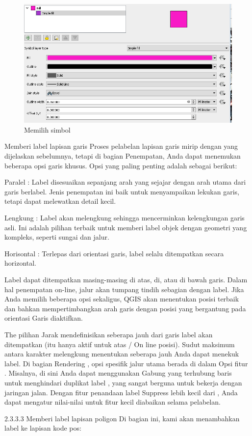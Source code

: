 \documentclass[]{book}
\begin{document}
\begin{figure}

{\centering \includegraphics[width=0.3\linewidth]{images/09/fig93} 

}

\caption{Memilih simbol}\label{fig:fig931}
\end{figure}

Memberi label lapisan garis
Proses pelabelan lapisan garis mirip dengan yang dijelaskan sebelumnya, tetapi di bagian Penempatan, Anda dapat menemukan beberapa opsi garis khusus. Opsi yang paling penting adalah sebagai berikut:

Paralel : Label disesuaikan sepanjang arah yang sejajar dengan arah utama dari garis berlabel. Jenis penempatan ini baik untuk menyampaikan lekukan garis, tetapi dapat melewatkan detail kecil.

Lengkung : Label akan melengkung sehingga mencerminkan kelengkungan garis asli. Ini adalah pilihan terbaik untuk memberi label objek dengan geometri yang kompleks, seperti sungai dan jalur.

Horisontal : Terlepas dari orientasi garis, label selalu ditempatkan secara horizontal.

Label dapat ditempatkan masing-masing di atas, di, atau di bawah garis. Dalam hal penempatan on-line, jalur akan tumpang tindih sebagian dengan label. Jika Anda memilih beberapa opsi sekaligus, QGIS akan menentukan posisi terbaik dan bahkan mempertimbangkan arah garis dengan posisi yang bergantung pada orientasi Garis diaktifkan.

The pilihan Jarak mendefinisikan seberapa jauh dari garis label akan ditempatkan (itu hanya aktif untuk atas / On line posisi). Sudut maksimum antara karakter melengkung menentukan seberapa jauh Anda dapat menekuk label. Di bagian Rendering , opsi spesifik jalur utama berada di dalam Opsi fitur . Misalnya, di sini Anda dapat menggunakan Gabung yang terhubung baris untuk menghindari duplikat label , yang sangat berguna untuk bekerja dengan jaringan jalan. Dengan fitur penandaan label Suppress lebih kecil dari , Anda dapat mengatur nilai-nilai untuk fitur kecil diabaikan selama pelabelan.

2.3.3.3 Memberi label lapisan poligon
Di bagian ini, kami akan menambahkan label ke lapisan kode pos:
\end{document}
